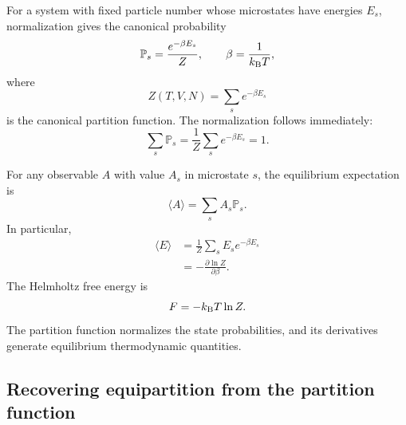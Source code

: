 For a system with fixed particle number whose microstates have energies $E_s$,
normalization gives the canonical probability
\begin{equation}
  \mathbb P_s
  =\frac{e^{-\beta E_s}}{Z},
  \qquad
  \beta=\frac{1}{k_{\mathrm B} T},
  \label{eq:canonical-state-probability}
\end{equation}
where
\begin{equation}
  \boxed{
  Z(T,V,N)=\sum_s e^{-\beta E_s}
  }
  \label{eq:canonical-partition-function}
\end{equation}
is the canonical partition function.  The normalization follows immediately:
\begin{equation}
  \sum_s\mathbb P_s
  =\frac{1}{Z}\sum_s e^{-\beta E_s}=1.
  \label{eq:canonical-probability-normalization}
\end{equation}

For any observable $A$ with value $A_s$ in microstate $s$, the equilibrium
expectation is
\begin{equation}
  \langle A\rangle
  =\sum_s A_s\mathbb P_s.
  \label{eq:canonical-observable-expectation}
\end{equation}
In particular,
\begin{equation}
\begin{aligned}
  \langle E\rangle
  &=\frac{1}{Z}\sum_sE_se^{-\beta E_s}\\
  &=-\frac{\partial\ln Z}{\partial\beta}.
\end{aligned}
  \label{eq:canonical-mean-energy}
\end{equation}
The Helmholtz free energy is
\begin{equation}
  F=-k_{\mathrm B} T\ln Z.
  \label{eq:helmholtz-from-partition-function}
\end{equation}
The partition function normalizes the state probabilities, and its derivatives
generate equilibrium thermodynamic quantities.

\subsection{Recovering equipartition from the partition function}


